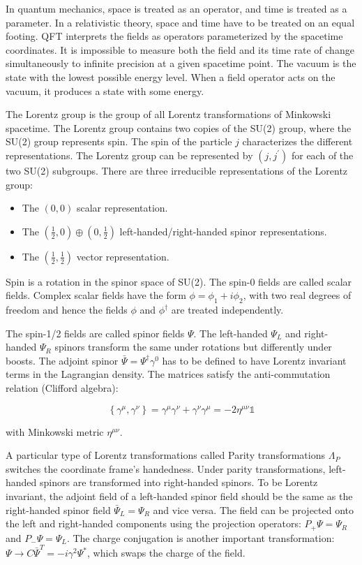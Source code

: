 In quantum mechanics, space is treated as an operator, and time is treated as a parameter. In a relativistic theory, space and time have to be treated on an equal footing. QFT interprets the fields as operators parameterized by the spacetime coordinates. It is impossible to measure both the field and its time rate of change simultaneously to infinite precision at a given spacetime point. The vacuum is the state with the lowest possible energy level. When a field operator acts on the vacuum, it produces a state with some energy.

The Lorentz group is the group of all Lorentz transformations of Minkowski spacetime. The Lorentz group contains two copies of the SU(2) group, where the SU(2) group represents spin. The spin of the particle $j$ characterizes the different representations. The Lorentz group can be represented by $(j, j^{\prime})$ for each of the two SU(2) subgroups. There are three irreducible representations of the Lorentz group:

\begin{itemize}
\item The $(0, 0)$ scalar representation.
\item The $(\frac{1}{2}, 0) \oplus(0, \frac{1}{2} )$ left-handed/right-handed spinor representations.
\item The $(\frac{1}{2}, \frac{1}{2} )$ vector representation.
\end{itemize}

Spin is a rotation in the spinor space of SU(2). The spin-0 fields are called scalar fields. Complex scalar fields have the form $\phi = \phi_{1} + i \phi_{2}$, with two real degrees of freedom and hence the fields $\phi$ and $\phi^{\dagger}$ are treated independently.

The spin-1/2 fields are called spinor fields $\Psi$. The left-handed $\Psi_{L}$ and right-handed $\Psi_{R}$ spinors transform the same under rotations but differently under boosts. The adjoint spinor $\bar{\Psi}=\Psi^{\dagger} \gamma^{0}$ has to be defined to have Lorentz invariant terms in the Lagrangian density. The matrices satisfy the anti-commutation relation (Clifford algebra):

\[ \left\{\gamma^{\mu}, \gamma^{\nu}\right\}=\gamma^{\mu} \gamma^{\nu}+\gamma^{\nu} \gamma^{\mu}=-2 \eta^{\mu \nu} \mathbb{1} \]

with Minkowski metric $\eta^{\mu \nu}$.

A particular type of Lorentz transformations called Parity transformations $\Lambda_{P}$ switches the coordinate frame's handedness. Under parity transformations, left-handed spinors are transformed into right-handed spinors. To be Lorentz invariant, the adjoint field of a left-handed spinor field should be the same as the right-handed spinor field $\bar{\Psi}_{L}=\Psi_{R}$ and vice versa. The field can be projected onto the left and right-handed components using the projection operators: $P_{+} \Psi=\Psi_{R}$ and $P_{-} \Psi=\Psi_{L}$. The charge conjugation is another important transformation: $\Psi \to C \bar{\Psi}^{T}=-i \gamma^2 \Psi^{*}$, which swaps the charge of the field.

